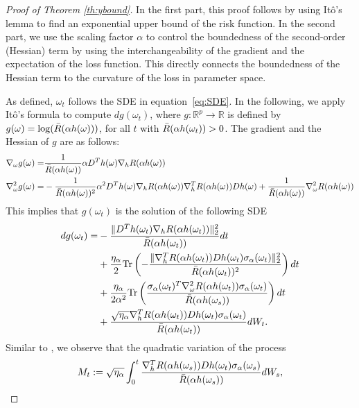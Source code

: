 \documentclass[10pt]{article} %
\def\eqref#1{equation~\ref{#1}}
\newcommand{\R}{\mathbb{R}}
\begin{document}
\begin{proof}[Proof of Theorem \ref{th:ybound}]
    In the first part, this proof follows \cite{lugosi2024convergencecontinuoustimestochasticgradient} by using It\^o's lemma to find an exponential upper bound of the risk function. In the second part, we use the scaling factor $\alpha$ to control the boundedness of the second-order (Hessian) term by using the interchangeability of the gradient and the expectation of the loss function. This directly connects the boundedness of the Hessian term to the curvature of the loss in parameter space.
    
    As defined, $\omega_t$ follows the SDE in \eqref{eq:SDE}. In the following, we apply Itô's formula to compute $dg(\omega_t)$, where $g:\R^p\rightarrow \R$ is defined by $g(\omega)=\log(\Bar{R}(\alpha h(\omega)))$, for all $t$ with $\Bar{R}(\alpha h(\omega_t))>0$. The gradient and the Hessian of $g$ are as follows:
    \begin{align*}
        \nabla_\omega g(\omega)=&\frac{1}{\Bar{R}(\alpha h(\omega))}\alpha D^Th(\omega)\nabla_h R(\alpha h(\omega))\\
        \nabla^2_\omega g(\omega)=& -\frac{1}{\Bar{R}(\alpha h(\omega))^2}\alpha^2 D^Th(\omega)\nabla_h R(\alpha h(\omega))\nabla_h^T R(\alpha h(\omega))Dh(\omega)+\frac{1}{\Bar{R}(\alpha h(\omega))} \nabla^2_\omega R(\alpha h(\omega))
    \end{align*}
    This implies that $g(\omega_t)$ is the solution of the following SDE
    \begin{align}
        dg(\omega_t)=&-\frac{\|D^Th(\omega_t)\nabla_h R(\alpha h(\omega_t))\|_2^2}{\Bar{R}(\alpha h(\omega_t))}dt\label{eq:gsde1}\\
        &+\frac{\eta_\alpha}{2}\mathrm{Tr}\left(-\frac{\|\nabla_h^TR(\alpha h(\omega_t))Dh(\omega_t)\sigma_\alpha(\omega_t)\|_2^2}{\Bar{R}(\alpha h(\omega_t))^2}\right)dt\label{eq:gsde2}\\
        &+\frac{\eta_\alpha}{2\alpha^2}\mathrm{Tr}\left(\frac{\sigma_\alpha(\omega_t)^T\nabla^2_\omega R(\alpha h(\omega_t))\sigma_\alpha(\omega_t)}{\Bar{R}(\alpha h(\omega_s))}\right)dt\label{eq:gsde3}\\
        &+\frac{\sqrt{\eta_\alpha}\nabla_h^TR(\alpha h(\omega_t))Dh(\omega_t)\sigma_\alpha(\omega_t)}{\Bar{R}(\alpha h(\omega_t))}dW_t.\label{eq:gsde4}
    \end{align}
    Similar to \citet{lugosi2024convergencecontinuoustimestochasticgradient}, we observe that the quadratic variation of the process
    $$M_t:=\sqrt{\eta_\alpha}\int_0^t\frac{\nabla_h^T R(\alpha h(\omega_s))Dh(\omega_t)\sigma_\alpha(\omega_s)}{\Bar{R}(\alpha h(\omega_s))}dW_s,$$

\end{proof}
\end{document}
